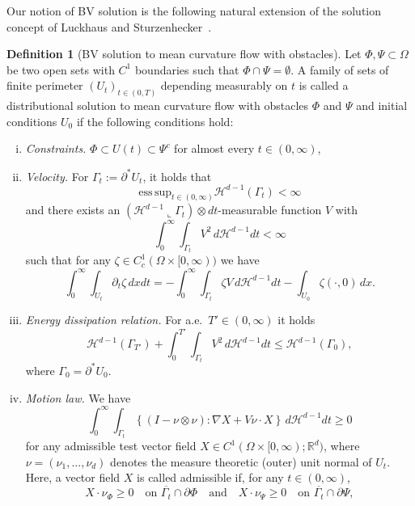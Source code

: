 \documentclass{amsart}
\theoremstyle{definition}
\newtheorem{definition}{Definition}[section]
\def\R{{\mathbb{R}}}
\begin{document}
 Our notion of BV solution is the following natural extension of the solution concept of Luckhaus and Sturzenhecker~\cite{MR1386964}.
\begin{definition}[BV solution to mean curvature flow with obstacles]\label{def:BVsol}
Let $\Phi, \Psi \subset \Omega$ be two open sets with $C^1$ boundaries such that $\Phi \cap \Psi = \emptyset$. 
A family of sets of finite perimeter $(U_t)_{t\in (0,T)}$ depending measurably on $t$ is called a distributional solution to mean curvature flow with obstacles $\Phi $ and $\Psi$ and initial conditions $U_0$ if the following conditions hold:
\begin{enumerate}[(i)]
\item \emph{Constraints.}
$\Phi \subset U(t) \subset \Psi^c$ for almost every $t \in (0,\infty)$,
\item \emph{Velocity.}
For $\Gamma _t  :=\partial^\ast U_t$, it holds that
\begin{equation}\label{BVsol:1}
\mathrm{ess\, sup}_{t \in (0,\infty)} \mathcal{H}^{d-1} (\Gamma_t) <\infty \end{equation}
and there exists an $(\mathcal{H}^{d-1}\llcorner{\Gamma _t})\otimes dt$-measurable function $V$ with
\begin{equation}\label{BVsol:2}
\int_0 ^{\infty }
\int_{\Gamma_t } V^2 \, d\mathcal{H}^{d-1} dt<\infty
\end{equation}
such that for any $\zeta \in C^1 _c (\Omega \times [0,\infty))  $
we have
\begin{equation}\label{BVsol:3}
\int_0 ^{\infty} \int_{U_t}
\partial_t \zeta \, dxdt
= 
-\int_0 ^{\infty} \int_{\Gamma_t } \zeta V  \, d\mathcal{H}^{d-1} dt
- \int_{U_0 } \zeta (\cdot,0) \, dx.
\end{equation}
\item \emph{Energy dissipation relation.} For a.e.\ $T' \in (0,\infty)$ it holds
\begin{equation}\label{BVsol:4}
\mathcal{H}^{d-1} (\Gamma_{T'})
+
\int _{0} ^{T'} \int_{\Gamma_t } V^2 \, d \mathcal{H}^{d-1} dt \leq \mathcal{H}^{d-1} (\Gamma_0),
\end{equation}
where $\Gamma_0=\partial^\ast U_0$.
\item \emph{Motion law.} We have 
\begin{equation}\label{BVsol:5}
\int_0 ^{\infty}
\int_{\Gamma_t} 
\left\{
\left( I - \nu \otimes \nu \right) \colon
\nabla X
+ V\nu \cdot X
\right\}
\, d\mathcal{H}^{d-1}dt
\geq 0
\end{equation}
for any admissible test vector field $X \in C^1 (\Omega \times [0,\infty);\R^d)$, where $\nu =(\nu_1,\dots,\nu_d)$ denotes the measure theoretic (outer) unit normal of $U_t$.
Here, a vector field $X$ is called admissible if, for any  $t \in (0,\infty)$,
\begin{equation}\label{BVsol:6}
	X \cdot \nu_\Phi \geq 0 \quad \text{on } \overline{\Gamma_t} \cap \partial \Phi
	\quad
    \text{and}
	\quad
    X\cdot \nu_\Psi \geq 0 \quad \text{on }  \overline{\Gamma_t} \cap \partial \Psi,
\end{equation}


\end{enumerate}
\end{definition}
\end{document}

